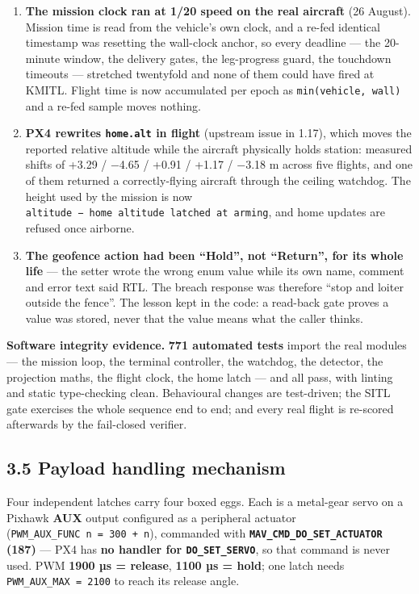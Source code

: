 \documentclass[
  10pt,
  a4paper,
  titlepage]{article}
\providecommand{\tightlist}{%
  \setlength{\itemsep}{0pt}\setlength{\parskip}{0pt}}
\begin{document}
\begin{enumerate}
\def\labelenumi{\arabic{enumi}.}
\tightlist
\item
  \textbf{The mission clock ran at 1/20 speed on the real aircraft} (26
  August). Mission time is read from the vehicle's own clock, and a
  re-fed identical timestamp was resetting the wall-clock anchor, so
  every deadline --- the 20-minute window, the delivery gates, the
  leg-progress guard, the touchdown timeouts --- stretched twentyfold
  and none of them could have fired at KMITL. Flight time is now
  accumulated per epoch as \texttt{min(vehicle,\ wall)} and a re-fed
  sample moves nothing.
\item
  \textbf{PX4 rewrites \texttt{home.alt} in flight} (upstream issue in
  1.17), which moves the reported relative altitude while the aircraft
  physically holds station: measured shifts of +3.29 / −4.65 / +0.91 /
  +1.17 / −3.18 m across five flights, and one of them returned a
  correctly-flying aircraft through the ceiling watchdog. The height
  used by the mission is now
  \texttt{altitude\ −\ home\ altitude\ latched\ at\ arming}, and home
  updates are refused once airborne.
\item
  \textbf{The geofence action had been ``Hold'', not ``Return'', for its
  whole life} --- the setter wrote the wrong enum value while its own
  name, comment and error text said RTL. The breach response was
  therefore ``stop and loiter outside the fence''. The lesson kept in
  the code: a read-back gate proves a value was stored, never that the
  value means what the caller thinks.
\end{enumerate}

\textbf{Software integrity evidence.} \textbf{771 automated tests}
import the real modules --- the mission loop, the terminal controller,
the watchdog, the detector, the projection maths, the flight clock, the
home latch --- and all pass, with linting and static type-checking
clean. Behavioural changes are test-driven; the SITL gate exercises the
whole sequence end to end; and every real flight is re-scored afterwards
by the fail-closed verifier.

\hypertarget{payload-handling-mechanism}{%
\subsection{3.5 Payload handling
mechanism}\label{payload-handling-mechanism}}

Four independent latches carry four boxed eggs. Each is a metal-gear
servo on a Pixhawk \textbf{AUX} output configured as a peripheral
actuator (\texttt{PWM\_AUX\_FUNC\ n\ =\ 300\ +\ n}), commanded with
\textbf{\texttt{MAV\_CMD\_DO\_SET\_ACTUATOR} (187)} --- PX4 has
\textbf{no handler for \texttt{DO\_SET\_SERVO}}, so that command is
never used. PWM \textbf{1900 µs = release}, \textbf{1100 µs = hold}; one
latch needs \texttt{PWM\_AUX\_MAX\ =\ 2100} to reach its release angle.
\end{document}

